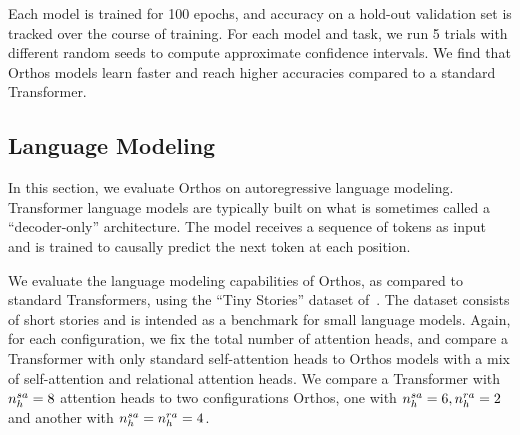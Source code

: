 Each model is trained for 100 epochs, and accuracy on a hold-out validation set is tracked over the course of training. For each model and task, we run 5 trials with different random seeds to compute approximate confidence intervals. We find that Orthos models learn faster and reach higher accuracies compared to a standard Transformer.

\subsection{Language Modeling}\label{ssec:tiny_stories}

In this section, we evaluate Orthos on autoregressive language modeling. Transformer language models are typically built on what is sometimes called a ``decoder-only'' architecture. The model receives a sequence of tokens as input and is trained to causally predict the next token at each position.

We evaluate the language modeling capabilities of Orthos, as compared to standard Transformers, using the ``Tiny Stories'' dataset of~\citet{eldanTinyStoriesHowSmall2023}. The dataset consists of short stories and is intended as a benchmark for small language models. Again, for each configuration, we fix the total number of attention heads, and compare a Transformer with only standard self-attention heads to Orthos models with a mix of self-attention and relational attention heads. We compare a Transformer with $n_h^{sa} = 8$ attention heads to two configurations Orthos, one with $n_h^{sa} = 6, n_h^{ra} = 2$ and another with $n_h^{sa} = n_h^{ra} = 4$.

